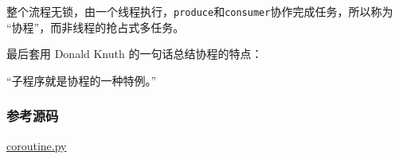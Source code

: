 整个流程无锁，由一个线程执行，\texttt{produce}和\texttt{consumer}协作完成任务，所以称为
``协程''，而非线程的抢占式多任务。

最后套用 Donald Knuth 的一句话总结协程的特点：

``子程序就是协程的一种特例。''

\hypertarget{ux53c2ux8003ux6e90ux7801}{%
\subsubsection{参考源码}\label{ux53c2ux8003ux6e90ux7801}}

\href{https://github.com/michaelliao/learn-python3/blob/master/samples/async/coroutine.py}{coroutine.py}

